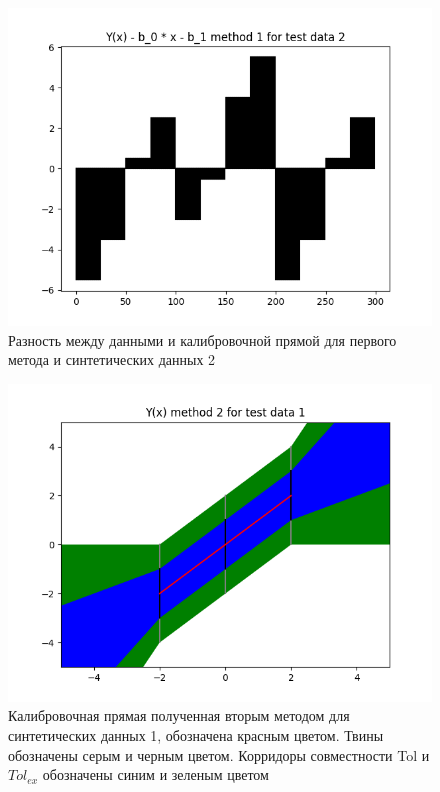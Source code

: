 \begin{figure}[H]
    \centering
    \includegraphics[width=0.7\linewidth]{image/test_2_method_1_difference.png}
    \caption{Разность между данными и калибровочной прямой для первого метода и синтетических данных 2}
    \label{fig:test_2_method_1_difference}
\end{figure}

\begin{figure}[H]
    \centering
    \includegraphics[width=0.7\linewidth]{image/test_1_method_2_corridor_joint_dependence.png}
    \caption{Калибровочная прямая полученная вторым методом для синтетических данных 1, обозначена красным цветом. Твины обозначены серым и черным цветом. Корридоры совместности Tol и $Tol_{ex}$ обозначены синим и зеленым цветом}
    \label{fig:test_1_method_2_corridor_joint_dependence}
\end{figure}

